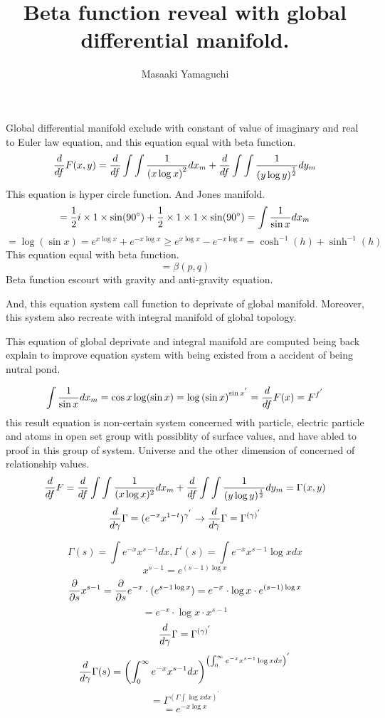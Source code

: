 \documentclass{jsarticle}
\begin{document}
\title{Beta function reveal with global differential manifold.}
\author{Masaaki Yamaguchi}
\date{}
\maketitle
 
  Global differential manifold exclude with constant of value of imaginary
  and real to Euler law equation, and this equation equal with beta function.
  $$ {d \over {d f}}F(x,y) = {d \over {d f}}\int\int{1 \over {(x\log x)}^{2}}
  dx_m + {d \over {d f}}\int\int{1 \over {(y \log y)}^{1 \over 2}}dy_m $$
  This equation is hyper circle function. And Jones manifold.
  $$ = {1 \over 2}i\times 1 \times \sin(90^{\circ}) + {1 \over 2}\times 1\times
  1\times \sin(90^{\circ}) = \int {1 \over {\sin x}}dx_m $$
  $$ = \log(\sin x) = e^{x\log x} + e^{-x\log x} \ge e^{x\log x} - e^{-x \log x}
  = \cosh^{-1}(h) + \sinh^{-1}(h) $$
  This equation equal with beta function.
  $$ = \beta(p,q) $$
  Beta function escourt with gravity and anti-gravity equation.

  And, this equation system call function to deprivate of global manifold.
  Moreover, this system also recreate with integral manifold of global topology.

  This equation of global deprivate and integral manifold are computed being
  back explain to improve equation system with being existed from a accident
  of being nutral pond.

  $$ \int {1 \over {\sin x}}dx_m = \cos x \log(\sin x) = \log{(\sin x)}^{{\sin 
  x}^{'}} = {d \over {d f}}F(x) = F^{f^{'}} $$
  this result equation is non-certain system concerned with particle, electric 
  particle and atoms in open set group with possiblity of surface values,
  and have abled to proof in this group of system. Universe and the other
  dimension of concerned of relationship values.
  $$ {d \over df}F = {d \over df} \int \int{1 \over (x \log x)^2}dx_m 
  + {d \over df} \int \int {1 \over (y \log y)^{1 \over 2}}dy_m
  = \Gamma(x,y) $$
  $$ {d \over d \gamma}\Gamma = (e^{-x}x^{1-t})^{\gamma^{'}} \to
  {d \over d \gamma}\Gamma = \Gamma^{(\gamma)^{'}}$$



    $$ \Gamma(s) = \int e^{-x} x^{s - 1}dx, \Gamma^{'}(s)
    = \int e^{-x} x^{s - 1}\log x dx $$
    $$ x^{s - 1} = e^{(s - 1)\log x} $$
    $$ {\partial \over \partial s}x^{s - 1} =
       {\partial \over \partial s}e^{-x}\cdot (e^{{s - 1}\log x}) 
       = e^{-x}\cdot \log x \cdot e^{(s - 1) \log x} $$
    $$ = e^{-x}\cdot \log x \cdot x^{s - 1} $$
    $$ {d \over d \gamma}\Gamma = \Gamma^{(\gamma)^{'}} $$
    $$ {d \over d \gamma}\Gamma(s) = \left( \int^{\infty}_{0}e^{-x}
    x^{s - 1}dx \right)^{\left(\int^{\infty}_{0}e^{-x}x^{s - 1}\log x dx
    \right)^{'}} $$
    $$ = \Gamma^{(\Gamma \int \log x dx)^{'}} $$
    $$ = e^{-x \log x} $$
\end{document}
